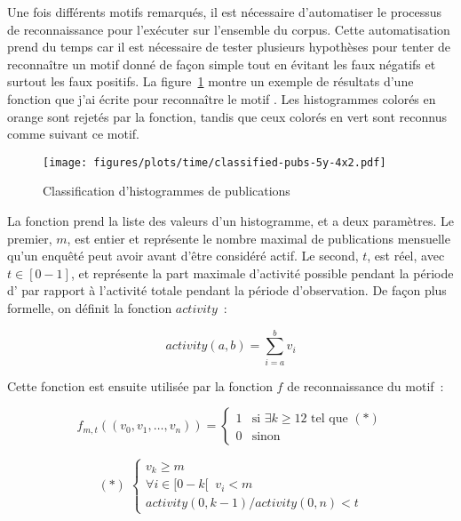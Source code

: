 Une fois différents motifs remarqués, il est nécessaire d’automatiser le
processus de reconnaissance pour l’exécuter sur l’ensemble du corpus. Cette
automatisation prend du temps car il est nécessaire de tester plusieurs
hypothèses pour tenter de reconnaître un motif donné de façon simple tout en
évitant les faux négatifs et surtout les faux positifs. La
figure~\ref{classified-pubs} montre un exemple de résultats d’une fonction que
j’ai écrite pour reconnaître le motif . Les histogrammes
colorés en orange sont rejetés par la fonction, tandis que ceux colorés en vert
sont reconnus comme suivant ce motif.

\begin{figure}[ht]
    \label{classified-pubs}
    \begin{center}
        \texttt{[image: figures/plots/time/classified-pubs-5y-4x2.pdf]}
    \end{center}
    \caption{Classification d’histogrammes de publications}
\end{figure}

La fonction prend la liste des valeurs d’un histogramme, et a deux paramètres.
Le premier, $m$, est entier et représente le nombre maximal de publications
mensuelle qu’un enquêté peut avoir avant d’être considéré actif. Le second,
$t$, est réel, avec $t\in[0-1]$, et représente la part maximale d’activité
possible pendant la période d’ par rapport à l’activité
totale pendant la période d’observation. De façon plus formelle, on définit la
fonction $activity$~:

$$activity(a, b) = \sum_{i=a}^{b} v_i$$

Cette fonction est ensuite utilisée par la fonction $f$ de reconnaissance du
motif~:

$$f_{m,t}((v_0, v_1, \ldots, v_n)) = \left\{\begin{array}{ll}
    1 & \mbox{si } \exists k\ge12 \mbox{ tel que } (\ast) \\
    0 & \mbox{sinon}
\end{array}\right.$$

$$(\ast)\;\left\{\begin{array}{l}
        v_k \ge m \\
        \forall i \in [0-k[\;\; v_i < m \\
        activity(0, k-1)/activity(0, n) < t
\end{array}\right.$$\\

